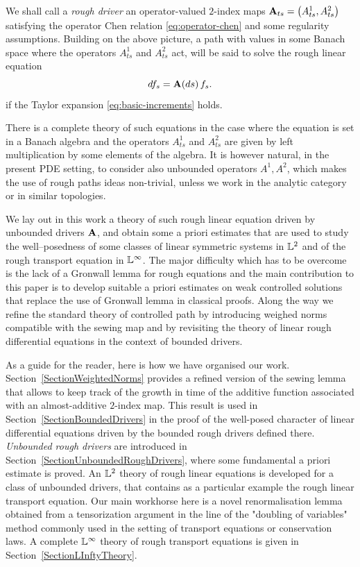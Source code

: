 \documentclass[11pt,a4paper]{amsart}
\newcommand{\ssk}{\smallskip}
\numberwithin{equation}{section} %
\begin{document}
\medskip

We shall call a \emph{rough driver} an operator-valued $2$-index maps ${\bf A}_{ts}=\big(A^1_{ts},A^2_{ts}\big)$ satisfying the operator Chen relation \eqref{eq:operator-chen} and some regularity assumptions. Building on the above picture, a path with values in some Banach space where the operators $A^1_{ts}$ and $A^2_{ts}$ act, will be said to solve the rough linear equation
$$
df_s = {\bf A}(ds)\,f_s.
$$
if the Taylor expansion \eqref{eq:basic-increments} holds.

\ssk

There is a complete theory of such equations in the case where the equation is set in a Banach algebra and the operators $A^1_{ts}$ and $A^2_{ts}$ are given by left multiplication by some elements of the algebra. It is however natural, in the present PDE setting, to consider also unbounded operators $A^1, A^2$, which makes the use of rough paths ideas non-trivial, unless we work in the analytic category or in similar topologies. 

\medskip
 
We lay out in this work a theory of such rough linear equation driven by unbounded drivers $\bf A$, and obtain some a priori estimates that are used to study the well--posedness of some classes of linear symmetric systems in $\mathbb{L}^2$ and of the rough transport equation in $\mathbb{L}^\infty$. The major difficulty which has to be overcome is the lack of a Gronwall lemma for rough equations and the main contribution to this paper is to develop suitable a priori estimates on weak controlled solutions that replace the use of Gronwall lemma in classical proofs. Along the way we refine the standard theory of controlled path by introducing weighed norms compatible with the sewing map and by revisiting the theory of linear rough differential equations in the context of bounded drivers. 

\medskip

As a guide for the reader, here is how we have organised our work. Section~\ref{SectionWeightedNorms} provides a refined version of the sewing lemma that allows to keep track of the growth in time of the additive function associated with an almost-additive $2$-index map. This result is used in Section~\ref{SectionBoundedDrivers} in the proof of the well-posed character of linear differential equations driven by the bounded rough drivers defined there. \emph{Unbounded rough drivers} are introduced in Section~\ref{SectionUnboundedRoughDrivers}, where some fundamental a priori estimate is proved. An $\mathbb{L}^2$ theory of rough linear equations is developed for a class of unbounded drivers, that contains as a particular example the rough linear transport equation. Our main workhorse here is a novel renormalisation lemma obtained from a tensorization argument in the line of the "doubling of variables" method commonly used in the setting of transport equations or conservation laws. A complete $\mathbb{L}^\infty$ theory of rough transport equations is given in Section~\ref{SectionLInftyTheory}.
\end{document}

